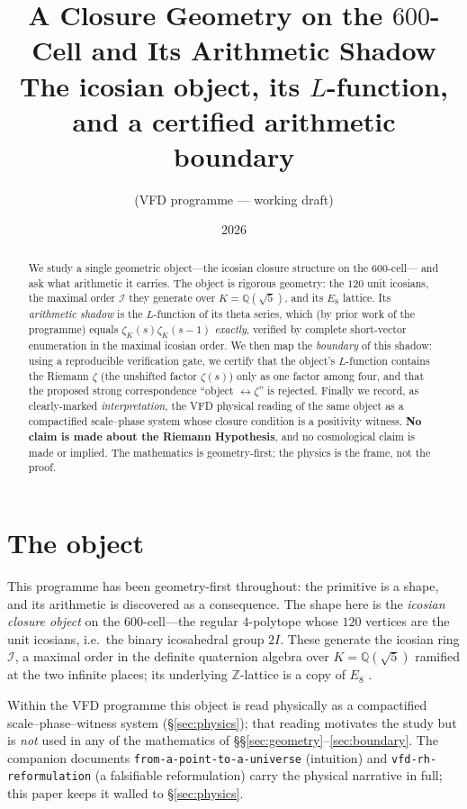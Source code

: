 \documentclass[11pt]{article}
\title{A Closure Geometry on the $600$-Cell and Its Arithmetic Shadow\\
\large The icosian object, its $L$-function, and a certified arithmetic boundary}
\author{(VFD programme --- working draft)}
\date{2026}
\theoremstyle{definition}
\newcommand{\Z}{\mathbb{Z}}
\newcommand{\Q}{\mathbb{Q}}
\newcommand{\zetaK}{\zeta_{K}}
\newcommand{\Icos}{\mathcal{I}}
\begin{document}
\maketitle

\begin{abstract}
We study a single geometric object---the icosian closure structure on the $600$-cell---
and ask what arithmetic it carries. The object is rigorous geometry: the $120$ unit
icosians, the maximal order $\Icos$ they generate over $K=\Q(\sqrt5)$, and its $E_8$
lattice. Its \emph{arithmetic shadow} is the $L$-function of its theta series, which
(by prior work of the programme) equals $\zetaK(s)\zetaK(s-1)$ \emph{exactly}, verified
by complete short-vector enumeration in the maximal icosian order. We then map the \emph{boundary} of this shadow: using a reproducible
verification gate, we certify that the object's $L$-function contains the Riemann
$\zeta$ (the unshifted factor $\zeta(s)$) only as one factor among four, and that the
proposed strong correspondence ``object $\leftrightarrow\zeta$'' is rejected. Finally we record, as clearly-marked
\emph{interpretation}, the VFD physical reading of the same object as a compactified
scale--phase system whose closure condition is a positivity witness. \textbf{No claim
is made about the Riemann Hypothesis}, and no cosmological claim is made or implied.
The mathematics is geometry-first; the physics is the frame, not the proof.
\end{abstract}

\section{The object}\label{sec:object}
This programme has been geometry-first throughout: the primitive is a shape, and its
arithmetic is discovered as a consequence. The shape here is the \emph{icosian closure
object} on the $600$-cell---the regular $4$-polytope whose $120$ vertices are the unit
icosians, i.e.\ the binary icosahedral group $2I$. These generate the icosian ring
$\Icos$, a maximal order in the definite quaternion algebra over $K=\Q(\sqrt5)$ ramified
at the two infinite places; its underlying $\Z$-lattice is a copy of $E_8$
\cite{ConwaySloane}.

Within the VFD programme this object is read physically as a compactified
scale--phase--witness system (\S\ref{sec:physics}); that reading motivates the study but
is \emph{not} used in any of the mathematics of \S\S\ref{sec:geometry}--\ref{sec:boundary}.
The companion documents \texttt{from-a-point-to-a-universe} (intuition) and
\texttt{vfd-rh-reformulation} (a falsifiable reformulation) carry the physical narrative
in full; this paper keeps it walled to \S\ref{sec:physics}.
\end{document}
